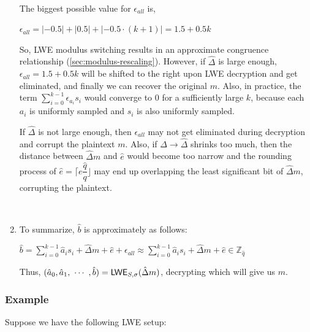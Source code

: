 \begin{myproof}
\begin{enumerate}
$ $

The biggest possible value for $\epsilon_{\textit{all}}$ is, 

$\epsilon_{\textit{all}} = |-0.5| + |0.5| + |-0.5 \cdot (k+1)| = 1.5 + 0.5k$ 

So, LWE modulus switching results in an approximate congruence relationship (\autoref{sec:modulus-rescaling}). However, if $\hat \Delta$ is large enough, $\epsilon_{\textit{all}} = 1.5 + 0.5k$ will be shifted to the right upon LWE decryption and get eliminated, and finally we can recover the original $m$. Also, in practice, the term $\sum\limits_{i=0}^{k-1}\epsilon_{a_i}s_i$ would converge to 0 for a sufficiently large $k$, because each $a_i$ is uniformly sampled and $s_i$ is also uniformly sampled. 

 If $\hat \Delta$ is not large enough, then $\epsilon_{all}$ may not get eliminated during decryption and corrupt the plaintext $m$. Also, if $\Delta \rightarrow \hat\Delta$ shrinks too much, then the distance between $\hat\Delta m$ and $\hat e$ would become too narrow and the rounding process of $\hat e = \Big\lceil e \dfrac{\hat{q}}{q} \Big\rfloor$ may end up overlapping the least significant bit of $\hat \Delta m$, corrupting the plaintext. 

$ $

\item To summarize, $\hat{b}$ is approximately as follows:

$\hat{b} = \sum\limits_{i=0}^{k-1}\hat{a}_is_i + \hat{\Delta} m + \hat{e} + \epsilon_{\textit{all}}  \approx \sum\limits_{i=0}^{k-1}\hat{a}_i  s_i + \hat{\Delta} m + \hat{e} \in \mathbb{Z}_{\hat{q}}$

Thus, $(\hat{a}_0, \hat{a}_1, \text{ } \text{$\cdots$} \text{ }, \hat{b}) = \textsf{LWE}_{{S},\sigma}(\hat{\Delta}  m)$, decrypting which will give us $m$.


\end{enumerate}
\end{myproof}

\subsubsection{Example}

Suppose we have the following LWE setup:

$ $

